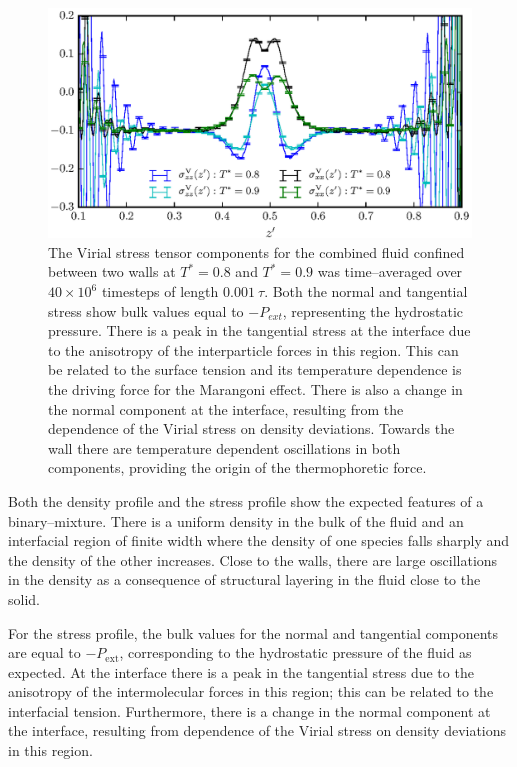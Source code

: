 \begin{figure}[h]
\centering
\includegraphics[scale=1.0]{PisVirStress}
\caption{The Virial stress tensor components for the combined fluid confined between two walls at $T^{*} = 0.8$ and $T^{*} = 0.9$ was time--averaged over $40 \times 10^{6}$ timesteps of length $0.001\ \tau$.
Both the normal and tangential stress show bulk values equal to $-P_{ext}$, representing the hydrostatic pressure.
There is a peak in the tangential stress at the interface due to the anisotropy of the interparticle forces in this region.
This can be related to the surface tension and its temperature dependence is the driving force for the Marangoni effect.
There is also a change in the normal component at the interface, resulting from the dependence of the Virial stress on density deviations.
Towards the wall there are temperature dependent oscillations in both components, providing the origin of the thermophoretic force.
}
\label{PisVirStress}
\end{figure}

Both the density profile and the stress profile show the expected features of a binary--mixture. 
There is a uniform density in the bulk of the fluid and an interfacial region of finite width where the density of one species falls sharply and the density of the other increases.
Close to the walls, there are large oscillations in the density as a consequence of structural layering in the fluid close to the solid.

For the stress profile, the bulk values for the normal and tangential components are equal to $-P_{\mathrm{ext}}$, corresponding to the hydrostatic pressure of the fluid as expected.
At the interface there is a peak in the tangential stress due to the anisotropy of the intermolecular forces in this region; this can be related to the interfacial tension.\cite{Marchand2011}
Furthermore, there is a change in the normal component at the interface, resulting from dependence of the Virial stress on density deviations in this region.


